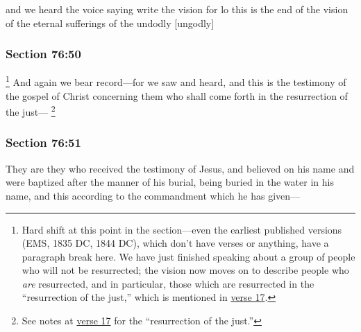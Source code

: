 		\begin{framed}
		\scriptsize
			\begin{compactdesc}
				\item[JSP] and we heard the voice saying write the vision for lo this is the end of the vision of the eternal sufferings of the undodly [ungodly]
			\end{compactdesc}
		\end{framed}

	\subsubsection{Section 76:50} %
		\label{DC76-50}

			\footnote{%
				Hard shift at this point in the section---even the earliest published versions (EMS, 1835 DC, 1844 DC), which don't have verses or anything, have a paragraph break here. We have just finished speaking about a group of people who will not be resurrected; the vision now moves on to describe people who \textit{are} resurrected, and in particular, those which are resurrected in the ``resurrection of the just,'' which is mentioned in \hyperref[DC76-17]{verse 17}.
				}%
		And again we bear record---for we saw and heard, and this is the testimony of the gospel of Christ concerning them who shall come forth in the resurrection of the just---%
			\footnote{%
				See notes at \hyperref[DC76-17]{verse 17} for the ``resurrection of the just.''
				}


	\subsubsection{Section 76:51} %
		\label{DC76-51}

		They are they who received the testimony of Jesus, and believed on his name and were baptized after the manner of his burial, being buried in the water in his name, and this according to the commandment which he has given---

